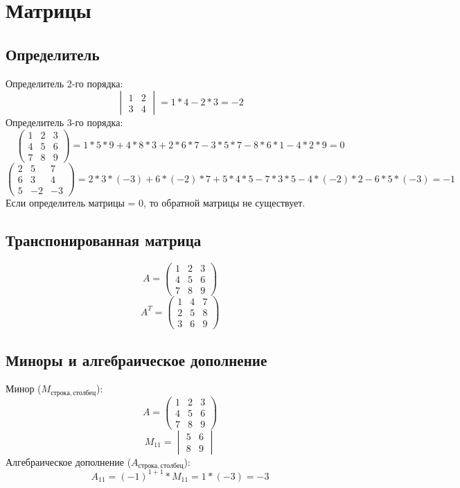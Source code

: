 \documentclass[12pt,a4paper]{article}
\begin{document}
\section{Матрицы}
\subsection{Определитель}
Определитель 2-го порядка:
$$\begin{vmatrix}
1& 2 \\
3& 4
\end{vmatrix}
= 1 * 4 - 2 * 3 = -2$$
Определитель 3-го порядка:
$$\begin{pmatrix}
1& 2& 3 \\
4& 5& 6 \\
7& 8& 9
\end{pmatrix}
= 1*5*9 + 4*8*3 + 2*6*7 - 3*5*7 - 8*6*1 - 4*2*9 = 0$$
$$\begin{pmatrix}
2& 5& 7 \\
6& 3& 4 \\
5& -2& -3
\end{pmatrix}
= 2*3*(-3) + 6*(-2)*7 + 5*4*5 - 7*3*5 - 4*(-2)*2 - 6*5*(-3) = -1$$
Если определитель матрицы = 0, то обратной матрицы не существует.
\subsection{Транспонированная матрица}
$$A=\begin{pmatrix}
1& 2& 3 \\
4& 5& 6 \\
7& 8& 9
\end{pmatrix}$$
$$A^{T}=\begin{pmatrix}
1& 4& 7 \\
2& 5& 8 \\
3& 6& 9
\end{pmatrix}$$
\subsection{Миноры и алгебраическое дополнение}
Минор ($M_{строка, столбец}$):
$$A=\begin{pmatrix}
1& 2& 3 \\
4& 5& 6 \\
7& 8& 9
\end{pmatrix}$$
$$M_{11}=\begin{vmatrix}
5& 6 \\
8& 9
\end{vmatrix}$$
Алгебраическое дополнение ($A_{строка, столбец}$):
$$A_{11}=(-1)^{1+1}*M_{11}=1*(-3)=-3$$
\end{document}
